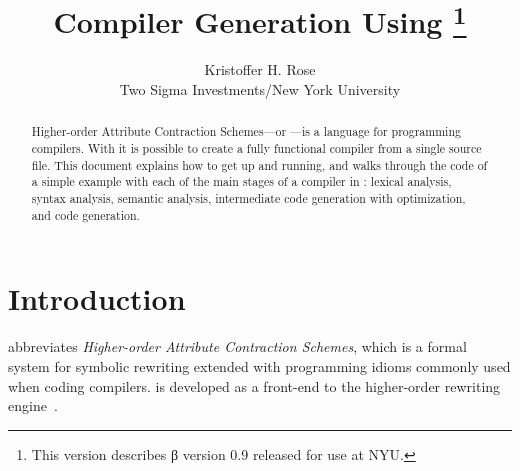 \documentclass[11pt]{article} %
\title{
  Compiler Generation Using \HAX\thanks{This version describes \HAX β version 0.9 released for use at NYU.}
}
\author{
  Kristoffer H. Rose\\
  Two Sigma Investments/New York University
}
\begin{document}
\maketitle

\begin{abstract}\noindent
  Higher-order Attribute Contraction Schemes---or \HAX---is a language for programming compilers.
  With \HAX it is possible to create a fully functional compiler from a single source file.  This
  document explains how to get \HAX up and running, and walks through the code of a simple example
  with each of the main stages of a compiler in \HAX: lexical analysis, syntax analysis, semantic
  analysis, intermediate code generation with optimization, and code generation.
\end{abstract}

\compacttableofcontents


\section{Introduction}\label{sec:intro}

\HAX abbreviates \emph{Higher-order Attribute Contraction Schemes}, which is a formal system for
symbolic rewriting extended with programming idioms commonly used when coding compilers. \HAX is
developed as a front-end to the \CRSX higher-order rewriting engine~\cite{crsx}.
\end{document}
